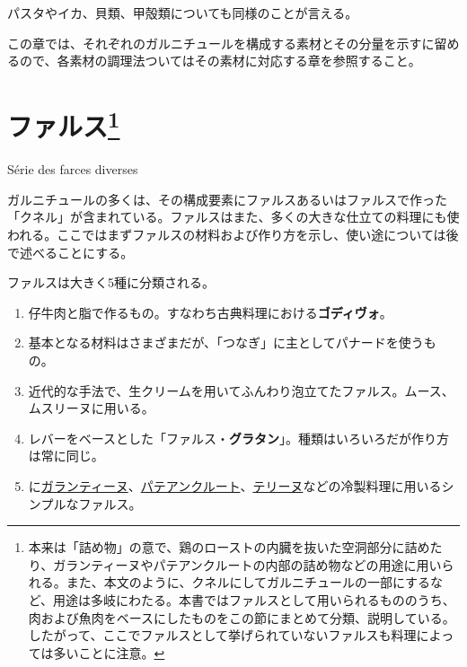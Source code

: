 \begin{main}
パスタやイカ、貝類、甲殻類についても同様のことが言える。

この章では、それぞれのガルニチュールを構成する素材とその分量を示すに留めるので、各素材の調理法ついてはその素材に対応する章を参照すること。

\hypertarget{serie-des-farces-diverses}{%
\section[ファルス]{\texorpdfstring{ファルス\footnote{本来は「詰め物」の意で、鶏のローストの内臓を抜いた空洞部分に詰めたり、ガランティーヌやパテアンクルートの内部の詰め物などの用途に用いられる。また、本文のように、クネルにしてガルニチュールの一部にするなど、用途は多岐にわたる。本書ではファルスとして用いられるもののうち、肉および魚肉をベースにしたものをこの節にまとめて分類、説明している。したがって、ここでファルスとして挙げられていないファルスも料理によっては多いことに注意。}}{ファルス}}\label{serie-des-farces-diverses}}

\begin{frsecenv}

Série des farces diverses

\end{frsecenv}

 

ガルニチュールの多くは、その構成要素にファルスあるいはファルスで作った「クネル」が含まれている。ファルスはまた、多くの大きな仕立ての料理にも使われる。ここではまずファルスの材料および作り方を示し、使い途については後で述べることにする。

ファルスは大きく5種に分類される。

\begin{enumerate}
\def\labelenumi{\arabic{enumi}.}
\item
  仔牛肉と脂で作るもの。すなわち古典料理における\textbf{ゴディヴォ}。
\item
  基本となる材料はさまざまだが、「つなぎ」に主としてパナードを使うもの。
\item
  近代的な手法で、生クリームを用いてふんわり泡立てたファルス。ムース、ムスリーヌに用いる。
\item
  レバーをベースとした「ファルス・\textbf{グラタン}」。種類はいろいろだが作り方は常に同じ。
\item
  に\protect\hyperlink{}{ガランティーヌ}、\protect\hyperlink{}{パテアンクルート}、\protect\hyperlink{}{テリーヌ}などの冷製料理に用いるシンプルなファルス。
\end{enumerate}


\end{main}
